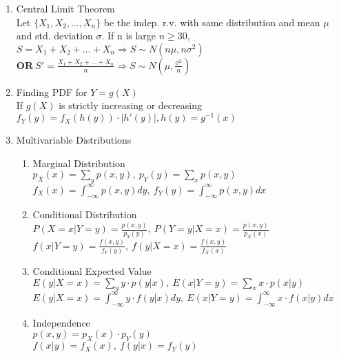 \documentclass[10pt]{article}
\begin{document}
\begin{multicols}{2}
\begin{enumerate}
			\item Central Limit Theorem\\
			Let $\{ X_1, X_2, \dots, X_n \}$ be the indep. r.v. with same distribution and mean $\mu$ and std. deviation $\sigma$. If n is large $n \ge 30$, 
			$ S = X_1 + X_2 + \dots + X_n \Rightarrow S\sim N(n\mu, n\sigma^2)$\\
			$\textbf{OR} \ S' = \frac{X_1 + X_2 + \dots + X_n}{n} \Rightarrow S\sim N(\mu, \frac{\sigma^2}{n})$
			\item Finding PDF for $Y = g(X)$\\
			If $g(X)$ is strictly increasing or decreasing\\
			$f_Y(y) = f_X(h(y)) \cdot |h'(y)|, h(y) = g^{-1}(x)$
			\item Multivariable Distributions
			\begin{enumerate}
				\item Marginal Distribution\\
				$p_X(x)=\sum_{y}p(x,y), \ p_Y(y)=\sum_{x}p(x,y) $\\
				$f_X(x) = \int_{-\infty}^{\infty}p(x,y)dy, \ f_Y(y) = \int_{-\infty}^{\infty}p(x,y)dx$
				\item Conditional Distribution\\
				$P(X = x|Y = y) = \frac{p(x,y)}{p_Y(y)}, \ P(Y = y|X = x) = \frac{p(x,y)}{p_X(x)}$\\
				$f(x|Y=y)=\frac{f(x,y)}{f_Y(y)}, \ f(y|X=x)=\frac{f(x,y)}{f_X(x)}$
				\item Conditional Expected Value\\
				$E(y|X=x) = \sum_{y}y\cdot p(y|x), \ E(x|Y=y) = \sum_{x}x\cdot p(x|y)$\\
				$E(y|X=x) = \int_{-\infty}^{\infty}y\cdot f(y|x)dy, \ E(x|Y=y) = \int_{-\infty}^{\infty}x\cdot f(x|y)dx$
				\item Independence\\
				$p(x,y) = p_X(x) \cdot p_Y(y)$\\
				$f(x|y) = f_X(x), \ f(y|x) = f_Y(y)$
			\end{enumerate}
		\end{enumerate}
		\newpage
	\end{multicols}
\end{document}
